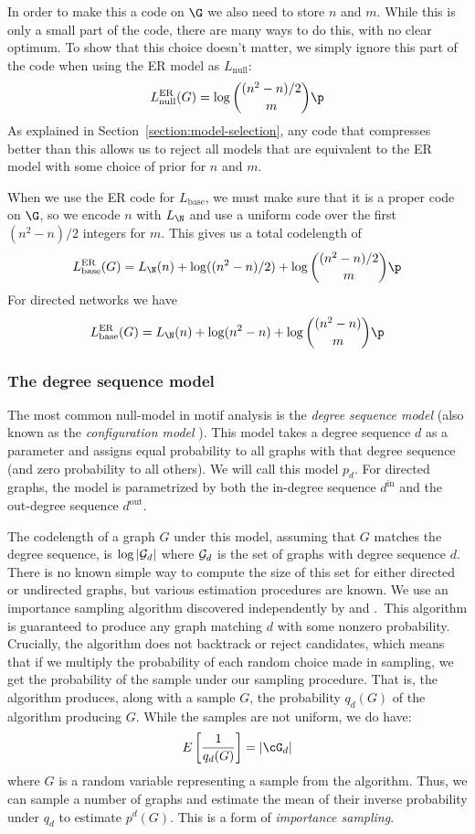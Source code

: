 In order to make this a code on $\G$ we also need to store $n$ and $m$. While this is only a small part of the code, there are many ways to do this, with no clear optimum. To show that this choice doesn't matter, we simply ignore this part of the code when using the ER model as $L_\text{null}$:
\[
L^\text{ER}_\text{null}(G) = \log{(n^2-n)/2 \choose m} \p
\] 
As explained in Section~\ref{section:model-selection}, any code that compresses better than this allows us to reject all models that are equivalent to the ER model with some choice of prior for $n$ and $m$.

When we use the ER code for $L_\text{base}$, we must make sure that it is a proper code on $\G$, so we encode $n$ with $L_\N$ and use a uniform code over the first $(n^2-n)/2$ integers for $m$. This gives us a total codelength of
\[
L^\text{ER}_\text{base}(G) = L_\N(n) + \log((n^2-n)/2) + \log{(n^2-n)/2 \choose m} \p
\]
For directed networks we have
\[
L^\text{ER}_\text{base}(G) = L_\N(n) + \log(n^2-n) + \log{(n^2-n) \choose m} \p
\]
 
\subsubsection{The degree sequence model}
\label{section:degree-sequence-model}

The most common null-model in motif analysis is the \emph{degree sequence model} (also known as the \emph{configuration model} \cite{newman2010networks}). This model takes a degree sequence $d$ as a parameter and assigns equal probability to all graphs with that degree sequence (and zero probability to all others). We will call this model $p_d$. For directed graphs, the model is parametrized by both the in-degree sequence $d^\text{in}$ and the out-degree sequence $d^\text{out}$. 

The codelength of a graph $G$ under this model, assuming that $G$ matches the degree sequence, is $\log |{\cal G}_d|$ where ${\cal G}_d$ is the set of graphs with degree sequence $d$. There is no known simple way to compute the size of this set for either directed or undirected graphs, but various estimation procedures are known. We use an importance sampling algorithm discovered independently by \cite{blitzstein2011sequential} and \cite{charo2010efficient}.\footnotemark~This algorithm is guaranteed to produce any graph matching $d$ with some nonzero probability. Crucially, the algorithm does not backtrack or reject candidates, which means that if we multiply the probability of each random choice made in sampling, we get the probability of the sample under our sampling procedure. That is, the algorithm produces, along with a sample $G$, the probability $q_d(G)$ of the algorithm producing $G$. While the samples are not uniform, we do have:
\[
{E} \left [\frac{1}{q_d(G)}\right] = |\cG_d| 
\]
where $G$ is a random variable representing a sample from the algorithm. Thus, we can sample a number of graphs and estimate the mean of their inverse probability under $q_d$ to estimate $p^d(G)$. This is a form of \emph{importance sampling}. 

